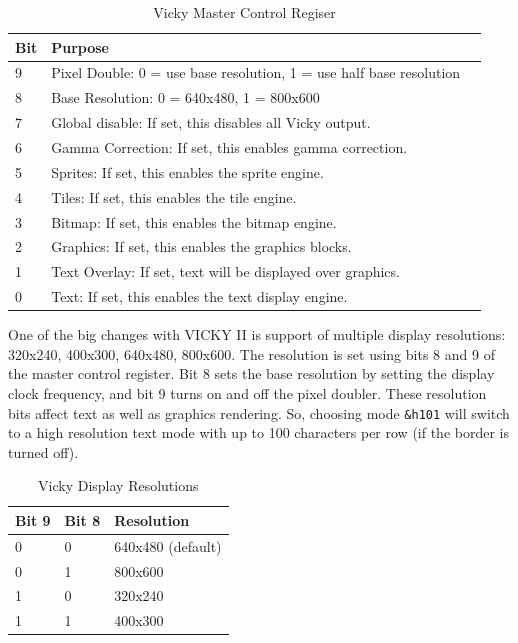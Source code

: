 \documentclass{report}
\begin{document}
    \begin{table}[!htb]
        \begin{center}
            \begin{tabular}{|l|l|l|} \hline
                Bit & Purpose \\ \hline\hline
                9 & Pixel Double: 0 = use base resolution, 1 = use half base resolution \\ \hline
                8 & Base Resolution: 0 = 640x480, 1 = 800x600 \\ \hline
                7 & Global disable: If set, this disables all Vicky output. \\ \hline
                6 & Gamma Correction: If set, this enables gamma correction. \\ \hline
                5 & Sprites: If set, this enables the sprite engine. \\ \hline
                4 & Tiles: If set, this enables the tile engine. \\ \hline
                3 & Bitmap: If set, this enables the bitmap engine. \\ \hline
                2 & Graphics: If set, this enables the graphics blocks. \\ \hline
                1 & Text Overlay: If set, text will be displayed over graphics. \\ \hline
                0 & Text: If set, this enables the text display engine. \\ \hline
            \end{tabular}
            \caption{Vicky Master Control Regiser}
            \label{vicky_mcr}
        \end{center}
    \end{table}

    One of the big changes with VICKY II is support of multiple display resolutions: 320x240,
    400x300, 640x480, 800x600. The resolution is set using bits 8 and 9 of the master control
    register. Bit 8 sets the base resolution by setting the display clock frequency, and bit 9
    turns on and off the pixel doubler. These resolution bits affect text as well as graphics
    rendering. So, choosing mode \verb+&h101+ will switch to a high resolution text mode with
    up to 100 characters per row (if the border is turned off).

    \begin{table}[!htb]
        \begin{center}
            \begin{tabular}{|l|l|l|} \hline
                Bit 9 & Bit 8 & Resolution \\ \hline\hline
                0 & 0 & 640x480 (default) \\ \hline
                0 & 1 & 800x600 \\ \hline
                1 & 0 & 320x240 \\ \hline
                1 & 1 & 400x300 \\ \hline
            \end{tabular}
            \caption{Vicky Display Resolutions}
            \label{vicky_res}
        \end{center}
    \end{table}    
\end{document}

